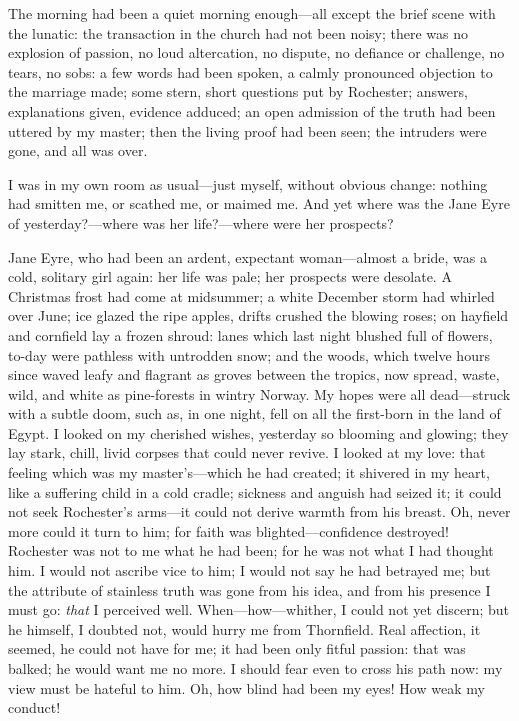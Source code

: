 The morning had been a quiet morning enough---all except the brief scene
with the lunatic: the transaction in the church had not been noisy;
there was no explosion of passion, no loud altercation, no dispute, no
defiance or challenge, no tears, no sobs: a few words had been spoken, a
calmly pronounced objection to the marriage made; some stern, short
questions put by \Mr{} Rochester; answers, explanations given, evidence
adduced; an open admission of the truth had been uttered by my master;
then the living proof had been seen; the intruders were gone, and all
was over.

I was in my own room as usual---just myself, without obvious change:
nothing had smitten me, or scathed me, or maimed me. And yet where was
the Jane Eyre of yesterday?---where was her life?---where were her
prospects?

Jane Eyre, who had been an ardent, expectant woman---almost a bride, was
a cold, solitary girl again: her life was pale; her prospects were
desolate. A Christmas frost had come at midsummer; a white December
storm had whirled over June; ice glazed the ripe apples, drifts crushed
the blowing roses; on hayfield and cornfield lay a frozen shroud: lanes
which last night blushed full of flowers, to-day were pathless with
untrodden snow; and the woods, which twelve hours since waved leafy and
flagrant as groves between the tropics, now spread, waste, wild, and
white as pine-forests in wintry Norway. My hopes were all dead---struck
with a subtle doom, such as, in one night, fell on all the first-born in
the land of Egypt. I looked on my cherished wishes, yesterday so
blooming and glowing; they lay stark, chill, livid corpses that could
never revive. I looked at my love: that feeling which was my
master's---which he had created; it shivered in my heart, like a
suffering child in a cold cradle; sickness and anguish had seized it; it
could not seek \Mr{} Rochester's arms---it could not derive warmth from
his breast. Oh, never more could it turn to him; for faith was
blighted---confidence destroyed! \Mr{} Rochester was not to me what he
had been; for he was not what I had thought him. I would not ascribe
vice to him; I would not say he had betrayed me; but the attribute of
stainless truth was gone from his idea, and from his presence I must go:
\emph{that} I perceived well. When---how---whither, I could not yet
discern; but he himself, I doubted not, would hurry me from Thornfield.
Real affection, it seemed, he could not have for me; it had been only
fitful passion: that was balked; he would want me no more. I should
fear even to cross his path now: my view must be hateful to him. Oh,
how blind had been my eyes! How weak my conduct!


